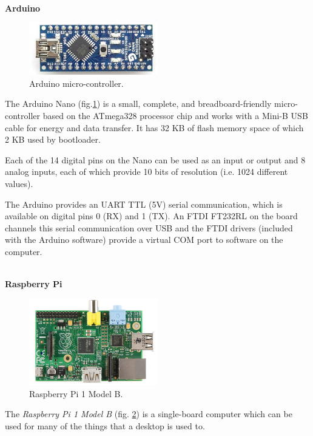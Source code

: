 \documentclass[12pt]{report}
\begin{document}
\textbf{\\Arduino}

\begin{figure}[H]
    \centering
    \includegraphics[width=0.5\textwidth]{img/arduino.png}
    \caption{Arduino micro-controller.}
    \label{fig:arduino}
\end{figure}

The Arduino Nano (fig.\ref{fig:arduino}) is a small, complete, and breadboard-friendly micro-controller based on the ATmega328 processor chip and works with a Mini-B USB cable for energy and data transfer. It has 32 KB of flash memory space of which 2 KB used by bootloader.

Each of the 14 digital pins on the Nano can be used as an input or output and 8 analog inputs, each of which provide 10 bits of resolution (i.e. 1024 different values). 

The Arduino provides an UART TTL (5V) serial communication, which is available on digital pins 0 (RX) and 1 (TX). An FTDI FT232RL on the board channels this serial communication over USB and the FTDI drivers (included with the Arduino software) provide a virtual COM port to software on the computer. 


\textbf{\\Raspberry Pi}

\begin{figure}[H]
    \centering
    \includegraphics[width=0.5\textwidth]{img/rpi.png}
    \caption{Raspberry Pi 1 Model B.}
    \label{fig:rpi}
\end{figure}

The \textit{Raspberry Pi 1 Model B} (fig. \ref{fig:rpi}) is a single-board computer which can be used for many of the things that a desktop is used to.
\end{document}
